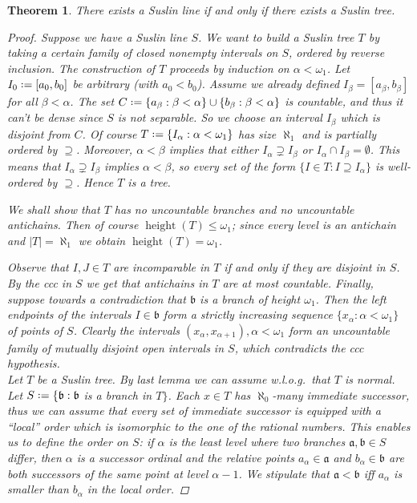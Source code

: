 \documentclass[11pt,a4paper]{report}
\newtheorem{theorem}{Theorem}[chapter] %
\theoremstyle{definition}
\theoremstyle{num.custom-title}
\theoremstyle{custom-title}
\DeclareMathOperator{\height}{height}
\newcommand*{\defeq}{\mathrel{\rlap{%
                     \raisebox{0.3ex}{$\cdot$}}%
                     \raisebox{-0.3ex}{$\cdot$}}%
                     =}
\begin{document}
\begin{theorem}
There exists a Suslin line if and only if there exists a Suslin tree.
\begin{proof}
Suppose we have a Suslin line $S$. We want to build a Suslin tree $T$ by taking a certain family of closed nonempty intervals on $S$, ordered by reverse inclusion. The construction of $T$ proceeds by induction on $\alpha < \omega_1$. Let $I_0 \defeq [a_0,b_0]$ be arbitrary (with $a_0 < b_0$). Assume we already defined $I_\beta = [a_\beta,b_\beta]$ for all $\beta < \alpha$. The set $C \defeq \{a_\beta : \beta < \alpha\} \cup \{b_\beta : \beta < \alpha\}$ is countable, and thus it can't be dense since $S$ is not separable. So we choose an interval $I_\beta$ which is disjoint from $C$. Of course $T \defeq \{I_\alpha : \alpha < \omega_1\}$ has size $\aleph_1$ and is partially ordered by $\supseteq$. Moreover, $\alpha < \beta$ implies that either $I_\alpha \supsetneq I_\beta$ or $I_\alpha \cap I_\beta = \emptyset$. This means that $I_\alpha \supsetneq I_\beta$ implies $\alpha < \beta$, so every set of the form $\{I \in T : I \supseteq I_\alpha\}$ is well-ordered by $\supseteq$. Hence $T$ is a tree.

We shall show that $T$ has no uncountable branches and no uncountable antichains. Then of course $\height(T) \leq \omega_1$; since every level is an antichain and $|T| = \aleph_1$ we obtain $\height(T) = \omega_1$.

Observe that $I,J \in T$ are incomparable in $T$ if and only if they are disjoint in $S$. By the ccc in $S$ we get that antichains in $T$ are at most countable. Finally, suppose towards a contradiction that $\mathfrak{b}$ is a branch of height $\omega_1$. Then the left endpoints of the intervals $I \in \mathfrak{b}$ form a strictly increasing sequence $\{x_\alpha : \alpha < \omega_1\}$ of points of $S$. Clearly the intervals $(x_\alpha, x_{\alpha+1}), \alpha < \omega_1$ form an uncountable family of mutually disjoint open intervals in $S$, which contradicts the ccc hypothesis.\\[6pt]
%
\indent Let $T$ be a Suslin tree. By last lemma we can assume w.l.o.g.\ that $T$ is normal. Let $S \defeq \{\mathfrak{b} : \mathfrak{b}$ is a branch in $T\}$. Each $x \in T$ has $\aleph_0$-many immediate successor, thus we can assume that every set of immediate successor is equipped with a ``local'' order which is isomorphic to the one of the rational numbers. This enables us to define the order on $S$: if $\alpha$ is the least level where two branches $\mathfrak{a}, \mathfrak{b} \in S$ differ, then $\alpha$ is a successor ordinal and the relative points $a_\alpha \in \mathfrak{a}$ and $b_\alpha \in \mathfrak{b}$ are both successors of the same point at level $\alpha-1$. We stipulate that $\mathfrak{a} < \mathfrak{b}$ iff $a_\alpha$ is smaller than $b_\alpha$ in the local order.


\end{proof}
\end{theorem}
\end{document}
